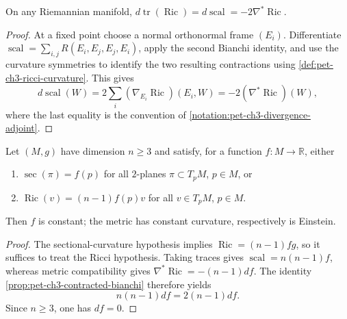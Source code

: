 \begin{proposition}
  \label{prop:pet-ch3-contracted-bianchi}


  On any Riemannian manifold, $d\operatorname{tr}(\operatorname{Ric})=d\operatorname{scal}=-2\nabla^*\operatorname{Ric}$.
\end{proposition}
\begin{proof}

  \sketch
  At a fixed point choose a normal orthonormal frame $(E_i)$. Differentiate
  $\operatorname{scal}=\sum_{i,j}R(E_i,E_j,E_j,E_i)$, apply the second Bianchi
  identity, and use the curvature symmetries to identify the two resulting
  contractions using \cref{def:pet-ch3-ricci-curvature}. This gives
  \[
   d\operatorname{scal}(W)
   =2\sum_i(\nabla_{E_i}\operatorname{Ric})(E_i,W)
   =-2(\nabla^*\operatorname{Ric})(W),
  \]
  where the last equality is the convention of
  \cref{notation:pet-ch3-divergence-adjoint}.
\end{proof}

\begin{lemma}
  \label{lem:pet-ch3-schur-lemma}


  Let $(M,g)$ have dimension $n\ge3$ and satisfy, for a function $f:M\to\mathbb
  R$, either
  \begin{enumerate}
    \item[(1)] $\sec(\pi)=f(p)$ for all $2$-planes $\pi\subset T_pM$, $p\in M$, or
    \item[(2)] $\operatorname{Ric}(v)=(n-1)f(p)v$ for all $v\in T_pM$, $p\in M$.
  \end{enumerate}
  Then $f$ is constant; the metric has constant curvature, respectively is
  Einstein.
\end{lemma}
\begin{proof}

  \sketch
  The sectional-curvature hypothesis implies
  $\operatorname{Ric}=(n-1)fg$, so it suffices to treat the Ricci hypothesis.
  Taking traces gives $\operatorname{scal}=n(n-1)f$, whereas metric compatibility
  gives $\nabla^*\operatorname{Ric}=-(n-1)df$.
  The identity \cref{prop:pet-ch3-contracted-bianchi} therefore yields
  \[
   n(n-1)df=2(n-1)df.
  \]
  Since $n\ge3$, one has $df=0$.
\end{proof}

